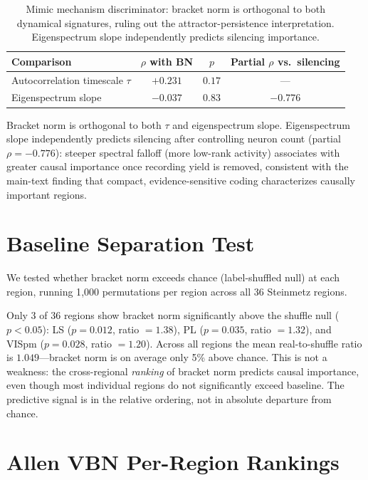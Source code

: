 \documentclass[9pt,lineno]{elife}
\begin{document}
\begin{table}[h]
\centering
\caption{Mimic mechanism discriminator: bracket norm is orthogonal to both dynamical signatures, ruling out the attractor-persistence interpretation. Eigenspectrum slope independently predicts silencing importance.}
\label{tab:mimic}
\small
\begin{tabular}{lccc}
\toprule
Comparison & $\rho$ with BN & $p$ & Partial $\rho$ vs.\ silencing \\
\midrule
Autocorrelation timescale $\tau$ & $+0.231$ & $0.17$ & --- \\
Eigenspectrum slope & $-0.037$ & $0.83$ & $-0.776$ \\
\bottomrule
\end{tabular}
\end{table}

Bracket norm is orthogonal to both $\tau$ and eigenspectrum slope. Eigenspectrum slope independently predicts silencing after controlling neuron count (partial $\rho = -0.776$): steeper spectral falloff (more low-rank activity) associates with greater causal importance once recording yield is removed, consistent with the main-text finding that compact, evidence-sensitive coding characterizes causally important regions.

\section{Baseline Separation Test}
\label{app:baseline}

We tested whether bracket norm exceeds chance (label-shuffled null) at each region, running 1{,}000 permutations per region across all 36 Steinmetz regions.

Only 3 of 36 regions show bracket norm significantly above the shuffle null ($p < 0.05$): LS ($p = 0.012$, ratio $= 1.38$), PL ($p = 0.035$, ratio $= 1.32$), and VISpm ($p = 0.028$, ratio $= 1.20$). Across all regions the mean real-to-shuffle ratio is $1.049$---bracket norm is on average only 5\% above chance. This is not a weakness: the cross-regional \emph{ranking} of bracket norm predicts causal importance, even though most individual regions do not significantly exceed baseline. The predictive signal is in the relative ordering, not in absolute departure from chance.

\section{Allen VBN Per-Region Rankings}
\label{app:vbn}
\end{document}
